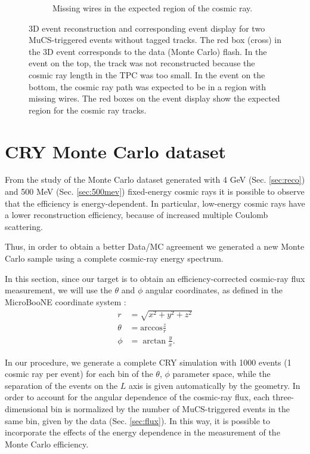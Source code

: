 \documentclass[a4paper]{scrartcl}
\begin{document}
\begin{figure}[htbp]
\begin{subfigure}{1\textwidth}
\begin{center}
\caption{Missing wires in the expected region of the cosmic ray.}\label{fig:wire}
\end{center}
\end{subfigure}
\caption{3D event reconstruction and corresponding event display for two MuCS-triggered events without tagged tracks. The red box (cross) in the 3D event corresponds to the data (Monte Carlo) flash. In the event on the top, the track was not reconstructed because the cosmic ray length in the TPC was too small. In the event on the bottom, the cosmic ray path was expected to be in a region with missing wires. The red boxes on the event display show the expected region for the cosmic ray tracks.} \label{fig:ineff}
\end{figure}
\clearpage{}


\section{CRY Monte Carlo dataset}\label{sec:cry}
From the study of the Monte Carlo dataset generated with 4 GeV (Sec. \ref{sec:reco}) and 500 MeV (Sec. \ref{sec:500mev}) fixed-energy cosmic rays it is possible to observe that the efficiency is energy-dependent. In particular, low-energy cosmic rays have a lower reconstruction efficiency, because of increased multiple Coulomb scattering. 

Thus, in order to obtain a better Data/MC agreement we generated a new Monte Carlo sample using a complete cosmic-ray energy spectrum.

In this section, since our target is to obtain an efficiency-corrected cosmic-ray flux measurement, we will use the $\theta$ and $\phi$ angular coordinates, as defined in the MicroBooNE coordinate system \cite{datamc}:
\begin{equation}
\begin{aligned}
r &= \sqrt{x^2+y^2+z^2}\\
\theta &= \mathrm{arccos}\frac{z}{r}\\ 
\phi &= \arctan \frac{y}{x}.
\end{aligned}
\end{equation}

In our procedure, we generate a complete CRY simulation with 1000 events (1 cosmic ray per event) for each bin of the $\theta$, $\phi$ parameter space, while the separation of the events on the $L$ axis is given automatically by the geometry. In order to account for the angular dependence of the cosmic-ray flux, each three-dimensional bin is normalized by the number of MuCS-triggered events in the same bin, given by the data (Sec. \ref{sec:flux}). In this way, it is possible to incorporate the effects of the energy dependence in the measurement of the Monte Carlo efficiency. 
\end{document}
